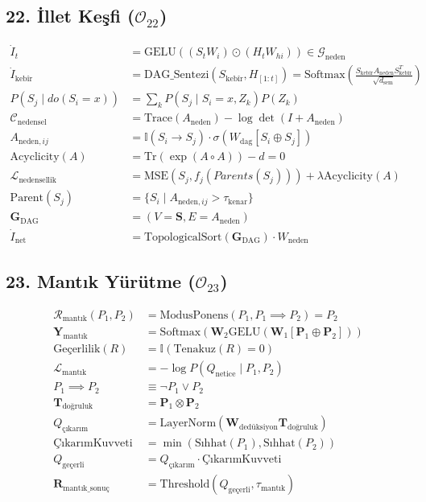\documentclass[11pt, a4paper]{article}
\begin{document}
\subsection{22. İllet Keşfi ($\mathcal{O}_{22}$)}
\begin{align}
\dot{I}_t &= \text{GELU}\left( (S_t W_i) \odot (H_t W_{hi}) \right) \in \mathcal{G}_{\text{neden}} \\
\dot{I}_{\text{kebîr}} &= \text{DAG\_Sentezi}(S_{\text{kebîr}}, H_{[1:t]}) = \text{Softmax}\left( \frac{S_{\text{kebîr}} A_{\text{neden}} S_{\text{kebîr}}^T}{\sqrt{d_{\text{sem}}}} \right) \\
P(S_j \mid do(S_i = x)) &= \sum_k P(S_j \mid S_i=x, Z_k) P(Z_k) \\
\mathcal{C}_{\text{nedensel}} &= \text{Trace}(A_{\text{neden}}) - \log \det(I + A_{\text{neden}}) \\
A_{\text{neden}, ij} &= \mathbb{I}(S_i \to S_j) \cdot \sigma(W_{\text{dag}} [S_i \oplus S_j]) \\
\text{Acyclicity}(A) &= \text{Tr}(\exp(A \circ A)) - d = 0 \\
\mathcal{L}_{\text{nedensellik}} &= \text{MSE}(S_j, f_j(Parents(S_j))) + \lambda \text{Acyclicity}(A) \\
\text{Parent}(S_j) &= \{ S_i \mid A_{\text{neden}, ij} > \tau_{\text{kenar}} \} \\
\mathbf{G}_{\text{DAG}} &= (V=\mathbf{S}, E=A_{\text{neden}}) \\
\dot{I}_{\text{net}} &= \text{TopologicalSort}(\mathbf{G}_{\text{DAG}}) \cdot W_{\text{neden}}
\end{align}

\subsection{23. Mantık Yürütme ($\mathcal{O}_{23}$)}
\begin{align}
\mathcal{R}_{\text{mantık}}(P_1, P_2) &= \text{ModusPonens}(P_1, P_1 \implies P_2) = P_2 \\
\mathbf{Y}_{\text{mantık}} &= \text{Softmax}\left( \mathbf{W}_2 \text{GELU}(\mathbf{W}_1 [\mathbf{P}_1 \oplus \mathbf{P}_2]) \right) \\
\text{Geçerlilik}(R) &= \mathbb{I}(\text{Tenakuz}(R) = 0) \\
\mathcal{L}_{\text{mantık}} &= -\log P(Q_{\text{netice}} \mid P_1, P_2) \\
P_1 \implies P_2 &\equiv \neg P_1 \lor P_2 \\
\mathbf{T}_{\text{doğruluk}} &= \mathbf{P}_1 \otimes \mathbf{P}_2 \\
Q_{\text{çıkarım}} &= \text{LayerNorm}(\mathbf{W}_{\text{dedüksiyon}} \mathbf{T}_{\text{doğruluk}}) \\
\text{ÇıkarımKuvveti} &= \min(\text{Sıhhat}(P_1), \text{Sıhhat}(P_2)) \\
Q_{\text{geçerli}} &= Q_{\text{çıkarım}} \cdot \text{ÇıkarımKuvveti} \\
\mathbf{R}_{\text{mantık\_sonuç}} &= \text{Threshold}(Q_{\text{geçerli}}, \tau_{\text{mantık}})
\end{align}
\end{document}
